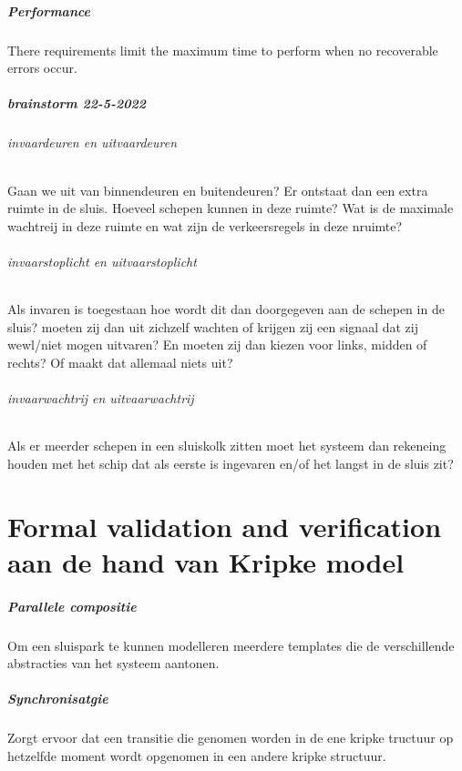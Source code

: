 \paragraph{Performance}
There requirements limit the maximum time to perform when no recoverable errors occur.



\paragraph{brainstorm 22-5-2022}

\subparagraph{invaardeuren en uitvaardeuren}
Gaan we uit van binnendeuren en buitendeuren? Er ontstaat dan een extra ruimte in de sluis. Hoeveel schepen kunnen in deze ruimte? Wat is de maximale wachtreij in deze ruimte en wat zijn de verkeersregels in deze nruimte?
\subparagraph{invaarstoplicht en uitvaarstoplicht}
Als invaren is toegestaan hoe wordt dit dan doorgegeven aan de schepen in de sluis? moeten zij dan uit zichzelf wachten of krijgen zij een signaal dat zij wewl/niet mogen uitvaren? En moeten zij dan kiezen voor links, midden of rechts? Of maakt dat allemaal niets uit?

\subparagraph{invaarwachtrij en uitvaarwachtrij}
Als er meerder schepen in een sluiskolk zitten moet het systeem dan rekeneing houden met het schip dat als eerste is ingevaren en/of het langst in de sluis zit?





\chapter{Formal validation and verification aan de hand van Kripke model}

\paragraph{Parallele compositie}
Om een sluispark te kunnen modelleren meerdere templates die de verschillende abstracties van het systeem aantonen.

\paragraph{Synchronisatgie}
Zorgt ervoor dat  een transitie die genomen worden in de ene kripke tructuur op hetzelfde moment wordt opgenomen in een andere kripke structuur.

